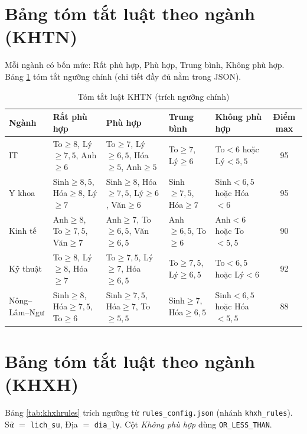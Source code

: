 \section{Bảng tóm tắt luật theo ngành (KHTN)}
Mỗi ngành có bốn mức: Rất phù hợp, Phù hợp, Trung bình, Không phù hợp. Bảng \ref{tab:khtnrules} tóm tắt ngưỡng chính (chi tiết đầy đủ nằm trong JSON).

\begin{table}[!htbp]
\centering
\caption{Tóm tắt luật KHTN (trích ngưỡng chính)}
\label{tab:khtnrules}
\small
\begin{tabular}{p{2.2cm}p{2.5cm}p{2.2cm}p{2.2cm}p{2.2cm}c}
\toprule
Ngành & Rất phù hợp & Phù hợp & Trung bình & Không phù hợp & Điểm max \\
\midrule
IT & To$\geq8$, Lý$\geq7{,}5$, Anh$\geq6$ & To$\geq7$, Lý$\geq6{,}5$, Hóa$\geq5$, Anh$\geq5$ & To$\geq7$, Lý$\geq6$ & To$<6$ hoặc Lý$<5{,}5$ & 95 \\
Y khoa & Sinh$\geq8{,}5$, Hóa$\geq8$, Lý$\geq7$ & Sinh$\geq8$, Hóa$\geq7{,}5$, Lý$\geq6$, Văn$\geq6$ & Sinh$\geq7{,}5$, Hóa$\geq7$ & Sinh$<6{,}5$ hoặc Hóa$<6$ & 95 \\
Kinh tế & Anh$\geq8$, To$\geq7{,}5$, Văn$\geq7$ & Anh$\geq7$, To$\geq6{,}5$, Văn$\geq6{,}5$ & Anh$\geq6{,}5$, To$\geq6$ & Anh$<6$ hoặc To$<5{,}5$ & 90 \\
Kỹ thuật & To$\geq8$, Lý$\geq8$, Hóa$\geq7$ & To$\geq7{,}5$, Lý$\geq7$, Hóa$\geq6{,}5$ & To$\geq7{,}5$, Lý$\geq6{,}5$ & To$<6{,}5$ hoặc Lý$<6$ & 92 \\
Nông--Lâm--Ngư & Sinh$\geq8$, Hóa$\geq7{,}5$, To$\geq6$ & Sinh$\geq7{,}5$, Hóa$\geq7$, To$\geq5{,}5$ & Sinh$\geq7$, Hóa$\geq6{,}5$ & Sinh$<6{,}5$ hoặc Hóa$<5{,}5$ & 88 \\
\bottomrule
\end{tabular}
\end{table}
\FloatBarrier

\section{Bảng tóm tắt luật theo ngành (KHXH)}
Bảng \ref{tab:khxhrules} trích ngưỡng từ \texttt{rules\_config.json} (nhánh \texttt{khxh\_rules}). Sử $=$ \texttt{lich\_su}, Địa $=$ \texttt{dia\_ly}. Cột \textit{Không phù hợp} dùng \texttt{OR\_LESS\_THAN}.

